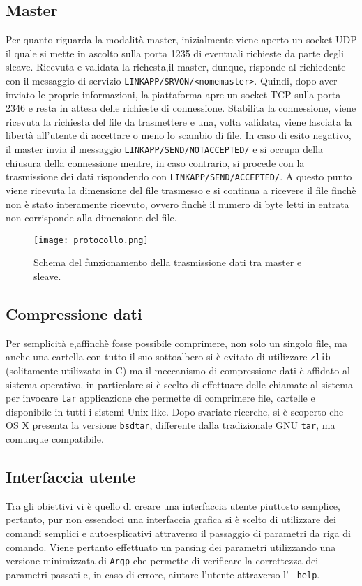 \documentclass[11pt,fleqn]{book} %
\begin{document}
\subsection{Master}
Per quanto riguarda la modalità master, inizialmente viene aperto un socket UDP il quale si mette in ascolto sulla porta 1235 di eventuali richieste da parte degli sleave. Ricevuta e validata la richesta,il master, dunque, risponde al richiedente con il messaggio di servizio \texttt{LINKAPP/SRVON/<nomemaster>}.
Quindi, dopo aver inviato le proprie informazioni, la piattaforma apre un socket TCP sulla porta 2346 e resta in attesa delle richieste di connessione.
Stabilita la connessione, viene ricevuta la richiesta del file da trasmettere e una, volta validata, viene lasciata la libertà all'utente di accettare o meno lo scambio di file. In caso di esito negativo, il master invia il messaggio  \texttt{LINKAPP/SEND/NOTACCEPTED/} e si occupa della chiusura della connessione mentre, in caso contrario, si procede con la trasmissione dei dati rispondendo con \texttt{LINKAPP/SEND/ACCEPTED/}.
A questo punto viene ricevuta la dimensione del file trasmesso e si continua a ricevere il file finchè non è stato interamente ricevuto, ovvero finchè il numero di byte letti in entrata non corrisponde alla dimensione del file.

\begin{figure}[h]
	\centering
    \texttt{[image: protocollo.png]}
    \caption{Schema del funzionamento della trasmissione dati tra master e sleave.}
    \label{fig:awesome_image}
\end{figure}


\subsection{Compressione dati}\label{Compressione}
Per semplicità e,affinchè fosse possibile comprimere, non solo un singolo file, ma anche una cartella con tutto il suo sottoalbero si è evitato di utilizzare  \texttt{zlib} (solitamente utilizzato in C) ma il meccanismo di  compressione dati è affidato al sistema operativo, in particolare si è scelto di effettuare delle chiamate al sistema per invocare \texttt{tar} applicazione che permette di comprimere file, cartelle e disponibile in tutti i sistemi Unix-like.
Dopo svariate ricerche, si è scoperto che OS X presenta la versione \texttt{bsdtar}, differente dalla tradizionale GNU \texttt{tar}, ma comunque compatibile.

\subsection{Interfaccia utente}
Tra gli obiettivi vi è quello di creare una interfaccia utente piuttosto semplice, pertanto, pur non essendoci una interfaccia grafica si è scelto di utilizzare dei comandi semplici e autoesplicativi attraverso il passaggio di parametri da riga di comando.
Viene pertanto effettuato un parsing dei parametri utilizzando una versione minimizzata di \texttt{Argp} che permette di verificare la correttezza dei parametri passati e, in caso di errore, aiutare l'utente attraverso l' \texttt{---help}.
\end{document}
